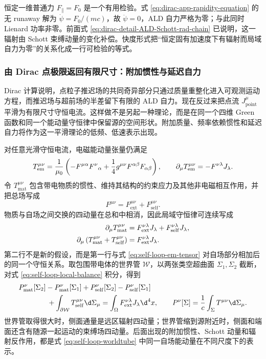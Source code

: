 恒定一维普通力 $F_\parallel=F_0$ 是一个有用检验。式 \eqref{eq:dirac-app-rapidity-equation} 的无 runaway 解为 $\dot\psi=F_0/(mc)$，故 $\ddot\psi=0$，ALD 自力严格为零；与此同时 Lienard 功率非零。前面式 \eqref{eq:dirac-detail-ALD-Schott-rad-chain} 已说明，这一辐射由 Schott 束缚动量的变化补偿。快度形式把“恒定固有加速度下有辐射而局域自力为零”的关系化成一行可检验的等式。


\subsubsection{由 Dirac 点极限返回有限尺寸：附加惯性与延迟自力}

Dirac 计算说明，点粒子推迟场的共同奇异部分只通过质量重整化进入可观测运动方程，而推迟场与超前场的半差留下有限的 ALD 自力。现在反过来把点流 $J^\mu_{\mathrm{point}}$ 平滑为有限尺寸守恒电流。这样做不是另起一种理论，而是在同一个四维 Green 函数和同一个能动量守恒律中保留源的空间形状。附加质量、频率依赖惯性和延迟自力将作为这一平滑理论的低频、低速表示出现。

对任意光滑守恒电流，电磁能动量张量仍满足
\begin{equation}
 T_{\mathrm{em}}^{\mu\nu}
 ={1\over\mu_0}
 \left(
 -F^{\mu\alpha}F^\nu{}_{\alpha}
 +{1\over4}g^{\mu\nu}F^{\alpha\beta}F_{\alpha\beta}
 \right),
 \qquad
 \partial_\mu T_{\mathrm{em}}^{\mu\nu}
 =-F^{\nu\lambda}J_\lambda.
 \label{eq:self-loop-em-tensor}
\end{equation}
令 $T_{\mathrm{mat}}^{\mu\nu}$ 包含带电物质的惯性、维持其结构的约束应力及其他非电磁相互作用，并把总场写成
\begin{equation*}
 F^{\mu\nu}=F_{\mathrm{ext}}^{\mu\nu}+F_{\mathrm{self}}^{\mu\nu}.
\end{equation*}
物质与自场之间交换的四动量在总和中相消，因此局域守恒律可连续写成
\begin{align}
 \partial_\mu T_{\mathrm{mat}}^{\mu\nu}
 &=F_{\mathrm{ext}}^{\nu\lambda}J_\lambda
   +F_{\mathrm{self}}^{\nu\lambda}J_\lambda,
 \notag\\
 \partial_\mu
 \left(T_{\mathrm{mat}}^{\mu\nu}+T_{\mathrm{self}}^{\mu\nu}\right)
 &=F_{\mathrm{ext}}^{\nu\lambda}J_\lambda.
 \label{eq:self-loop-local-balance}
\end{align}
第二行不是新的假设，而是第一行与式 \eqref{eq:self-loop-em-tensor} 对自场部分相加后的同一个守恒关系。取包围带电体的世界管 $\mathcal W$，以两张类空超曲面 $\Sigma_1,\Sigma_2$ 截断，对式 \eqref{eq:self-loop-local-balance} 积分，得到
\begin{align}
 &P_{\mathrm{mat}}^\nu[\Sigma_2]-P_{\mathrm{mat}}^\nu[\Sigma_1]
 +P_{\mathrm{self}}^\nu[\Sigma_2]-P_{\mathrm{self}}^\nu[\Sigma_1]
 \notag\\
 &\hspace{4em}
 +\int_{\partial\mathcal W}T_{\mathrm{self}}^{\mu\nu}\d\Sigma_\mu
 =\int_\Omega F_{\mathrm{ext}}^{\nu\lambda}J_\lambda\d^4x,
 \qquad
 P^\nu[\Sigma]={1\over c}\int_\Sigma T^{\mu\nu}\d\Sigma_\mu.
 \label{eq:self-loop-worldtube}
\end{align}
世界管取得很大时，侧面通量是远区辐射四动量；世界管缩到源附近时，侧面和端面还含有随源一起运动的束缚场四动量。后面出现的附加惯性、Schott 动量和辐射反作用，都是式 \eqref{eq:self-loop-worldtube} 中同一自场能动量在不同尺度下的表示。

